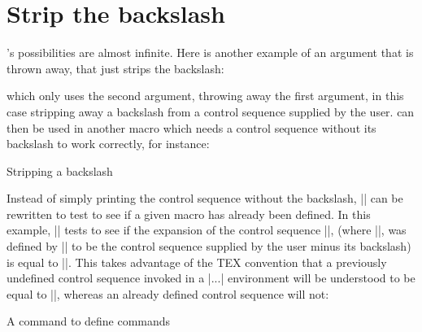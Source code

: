 \section*{Strip the backslash}

\tex's possibilities are almost infinite. Here is another example of
an argument that is thrown away\cite{amy1990}, that just strips the backslash:

\begin{teXXX}
\def\stripbackslash#1#2*{\def\one{#2}}
\end{teXXX}

which only uses the second argument, throwing away the
first argument, in this case stripping away a backslash
from a control sequence supplied by the user. 
can then be used in another macro which
needs a control sequence without its backslash to work
correctly, for instance:

\begin{texexample}{Stripping a backslash}{}
\def\stripbackslash#1#2*{\def\one{#2}}
\def\newdef#1{\expandafter
\stripbackslash\string#1* \one}

\newdef\testmacro
\end{texexample}



Instead of simply printing the control sequence without
the backslash, |\newdef| can be rewritten to test to see
if a given macro has already been defined. In this example,
|\newdef| tests to see if the expansion of the control
sequence |\csname\one\endcsname|, (where |\one|,
was defined by |\stripbackslash| to be the control sequence
supplied by the user minus its backslash) is equal
to |\relax|. This takes advantage of the TEX convention
that a previously undefined control sequence invoked in
a |\csname...\endcsname| environment will be understood
to be equal to |\relax|, whereas an already defined
control sequence will not:

\begin{texexample}{A command to define commands}{}
\def\newdef#1{%
  \expandafter\stripbackslash\string#1*
  \expandafter
  \ifx\csname\one\endcsname\relax
  \else %
    {\tt Sorry, \string#1 has already been
     defined. Please supply a new name.}
\fi}
\end{texexample}

